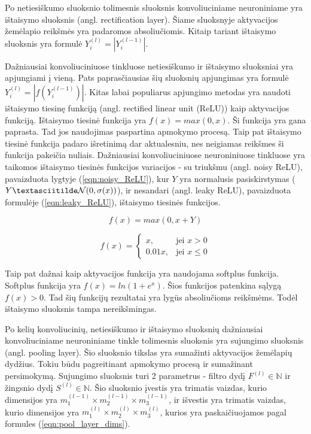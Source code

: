 Po netiesiškumo sluoksnio tolimesnis sluoksnis konvoliuciniame neuroniniame yra ištaisymo sluoksnis (angl. rectification layer). Šiame sluoksnyje aktyvacijos žemėlapio reikšmės yra padaromos absoliučiomis. Kitaip tariant ištaisymo sluoksnis yra formulė $Y_i^{(l)} = |Y_i^{(l - 1)}|$.

Dažniausiai konvoliuciniuose tinkluose netiesiškumo ir ištaisymo sluoksniai yra apjungiami į vieną. Pats paprasčiausias šių sluoksnių apjungimas yra formulė  $Y_i^{(l)} = |f(Y_i^{(l - 1)})|$. Kitas labai populiarus apjungimo metodas yra naudoti ištaisymo tiesinę funkciją (angl. rectified linear unit (ReLU)) kaip aktyvacijos funkciją. Ištaisymo tiesinė funkcija yra $f(x) = max(0, x)$. Ši funkcija yra gana paprasta. Tad jos naudojimas paspartina apmokymo procesą. Taip pat ištaisymo tiesinė funkcija padaro išretinimą dar aktualesniu, nes neigiamas reikšmes ši funkcija pakeičia nuliais. Dažniausiai konvoliuciniuose neuroniniuose tinkluose yra taikomos ištaisymo tiesinės funkcijos variacijos - su triukšmu (angl. noisy ReLU), pavaizduota lygtyje (\ref{eqn:noisy_ReLU}), kur $Y$ yra normalusis pasiskirstymas ($Y \textasciitilde \mathcal{N}(0, \sigma(x))$), ir nesandari (angl. leaky ReLU), pavaizduota formulėje (\ref{eqn:leaky_ReLU}),  ištaisymo tiesinės funkcijos.

\begin{equation}
\label{eqn:noisy_ReLU}
	f(x) = max(0, x + Y)
\end{equation}

\begin{equation}
\label{eqn:leaky_ReLU}
	f(x) = 
	\begin{cases}
	x, & \mbox{jei } x > 0 \\
	0.01x, & \mbox{jei } x \leq 0
	\end{cases}
\end{equation}

Taip pat dažnai kaip aktyvacijos funkcija yra naudojama softplus funkcija. Softplus funkcija yra $f(x) = ln(1 + e^x)$. Šios funkcijos patenkina sąlygą $f(x) > 0$. Tad šių funkcijų rezultatai yra lygūs absoliučioms reikšmėms. Todėl ištaisymo sluoksnis tampa nereikšmingas.

Po kelių konvoliucinių, netiesiškumo ir ištaisymo sluoksnių dažniausiai konvoliuciniame neuroniniame tinkle tolimesnis sluoksnis yra sujungimo sluoksnis (angl. pooling layer). Šio sluoksnio tikslas yra sumažinti aktyvacijos žemėlapių dydžius. Tokiu būdu pagreitinant apmokymo procesą ir sumažinant persimokymą. Sujungimo sluoksnis turi 2 parametrus - filtro dydį $F^{(l)} \in \mathbb{N}$ ir žingsnio dydį $S^{(l)} \in \mathbb{N}$. Šio sluoksnio įvestis yra trimatis vaizdas, kurio dimensijos yra $m_1^{(l-1)} \times m_2^{(l-1)} \times m_3^{(l-1)}$, ir išvestis yra trimatis vaizdas, kurio dimensijos yra $m_1^{(l)} \times m_2^{(l)} \times m_3^{(l)}$, kurios yra paskaičiuojamos pagal formules (\ref{eqn:pool_layer_dims}).

